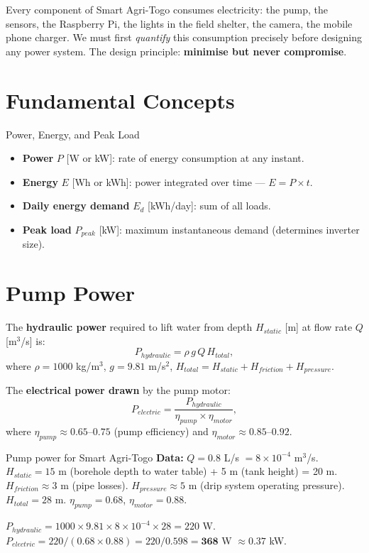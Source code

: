 \documentclass[12pt,a4paper,openany]{book}
\begin{document}
Every component of Smart Agri-Togo consumes electricity: the pump, the sensors, the Raspberry Pi, the lights in the field shelter, the camera, the mobile phone charger. We must first \textit{quantify} this consumption precisely before designing any power system. The design principle: \textbf{minimise but never compromise}.

\section{Fundamental Concepts}

\begin{defbox}{Power, Energy, and Peak Load}
\begin{itemize}[leftmargin=1.5em]
  \item \textbf{Power} $P$ [W or kW]: rate of energy consumption at any instant.
  \item \textbf{Energy} $E$ [Wh or kWh]: power integrated over time — $E=P\times t$.
  \item \textbf{Daily energy demand} $E_d$ [kWh/day]: sum of all loads.
  \item \textbf{Peak load} $P_{peak}$ [kW]: maximum instantaneous demand (determines inverter size).
\end{itemize}
\end{defbox}

\section{Pump Power}

The \textbf{hydraulic power} required to lift water from depth $H_{static}$ [m] at flow rate $Q$ [m$^3$/s] is:
\begin{equation}
  P_{hydraulic} = \rho\,g\,Q\,H_{total},
\end{equation}
where $\rho=1000$ kg/m$^3$, $g=9.81$ m/s$^2$, $H_{total}=H_{static}+H_{friction}+H_{pressure}$.

The \textbf{electrical power drawn} by the pump motor:
\begin{equation}
  P_{electric} = \frac{P_{hydraulic}}{\eta_{pump}\times\eta_{motor}},
\end{equation}
where $\eta_{pump}\approx0.65$--$0.75$ (pump efficiency) and $\eta_{motor}\approx0.85$--$0.92$.

\begin{exbox}{Pump power for Smart Agri-Togo}
\textbf{Data:} $Q=0.8$ L/s $=8\times10^{-4}$ m$^3$/s. $H_{static}=15$ m (borehole depth to water table) + 5 m (tank height) = 20 m. $H_{friction}\approx3$ m (pipe losses). $H_{pressure}\approx5$ m (drip system operating pressure). $H_{total}=28$ m. $\eta_{pump}=0.68$, $\eta_{motor}=0.88$.

$P_{hydraulic}=1000\times9.81\times8\times10^{-4}\times28=220$ W.
$P_{electric}=220/(0.68\times0.88)=220/0.598=\mathbf{368}$ W $\approx\mathbf{0.37}$ kW.
\end{exbox}
\end{document}
